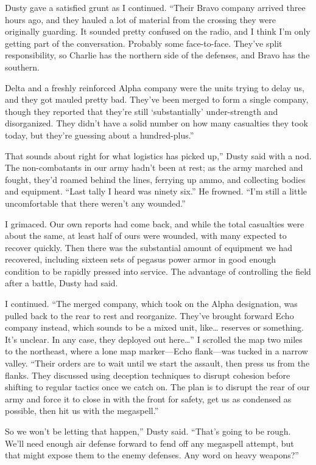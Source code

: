 Dusty gave a satisfied grunt as I continued. “Their Bravo company arrived three hours ago, and they hauled a lot of material from the crossing they were originally guarding. It sounded pretty confused on the radio, and I think I’m only getting part of the conversation. Probably some face-to-face. They’ve split responsibility, so Charlie has the northern side of the defenses, and Bravo has the southern.

\leavevmode{}Delta and a freshly reinforced Alpha company were the units trying to delay us, and they got mauled pretty bad. They’ve been merged to form a single company, though they reported that they’re still ‘substantially’ under-strength and disorganized. They didn’t have a solid number on how many casualties they took today, but they’re guessing about a hundred-plus.”

\leavevmode{}That sounds about right for what logistics has picked up,” Dusty said with a nod. The non-combatants in our army hadn’t been at rest; as the army marched and fought, they’d roamed behind the lines, ferrying up ammo, and collecting bodies and equipment. “Last tally I heard was ninety six.” He frowned. “I’m still a little uncomfortable that there weren’t any wounded.”

I grimaced. Our own reports had come back, and while the total casualties were about the same, at least half of ours were wounded, with many expected to recover quickly. Then there was the substantial amount of equipment we had recovered, including sixteen sets of pegasus power armor in good enough condition to be rapidly pressed into service. The advantage of controlling the field after a battle, Dusty had said.

I continued. “The merged company, which took on the Alpha designation, was pulled back to the rear to rest and reorganize. They’ve brought forward Echo company instead, which sounds to be a mixed unit, like… reserves or something. It’s unclear. In any case, they deployed out here…” I scrolled the map two miles to the northeast, where a lone map marker—Echo flank—was tucked in a narrow valley. “Their orders are to wait until we start the assault, then press us from the flanks. They discussed using deception techniques to disrupt cohesion before shifting to regular tactics once we catch on. The plan is to disrupt the rear of our army and force it to close in with the front for safety, get us as condensed as possible, then hit us with the megaspell.”

\leavevmode{}So we won’t be letting that happen,” Dusty said. “That’s going to be rough. We’ll need enough air defense forward to fend off any megaspell attempt, but that might expose them to the enemy defenses. Any word on heavy weapons?”

